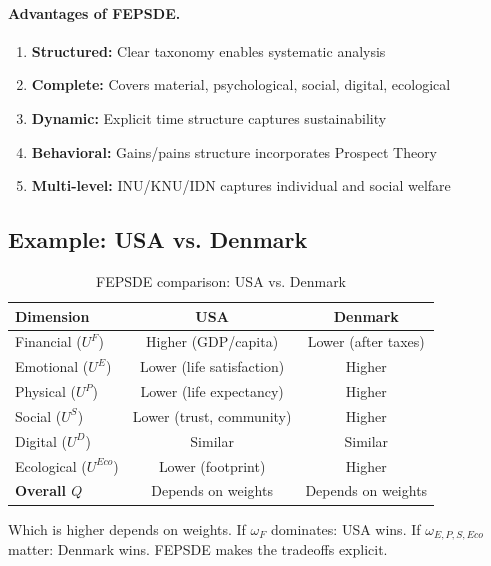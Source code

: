 \paragraph{Advantages of FEPSDE.}
\begin{enumerate}[nosep]
  \item \textbf{Structured:} Clear taxonomy enables systematic analysis
  \item \textbf{Complete:} Covers material, psychological, social, digital, ecological
  \item \textbf{Dynamic:} Explicit time structure captures sustainability
  \item \textbf{Behavioral:} Gains/pains structure incorporates Prospect Theory
  \item \textbf{Multi-level:} INU/KNU/IDN captures individual and social welfare
\end{enumerate}

\subsection{Example: USA vs. Denmark}

\begin{table}[h]
\centering
\begin{tabular}{lcc}
\toprule
\textbf{Dimension} & \textbf{USA} & \textbf{Denmark} \\
\midrule
Financial ($U^F$) & Higher (GDP/capita) & Lower (after taxes) \\
Emotional ($U^E$) & Lower (life satisfaction) & Higher \\
Physical ($U^P$) & Lower (life expectancy) & Higher \\
Social ($U^S$) & Lower (trust, community) & Higher \\
Digital ($U^D$) & Similar & Similar \\
Ecological ($U^{Eco}$) & Lower (footprint) & Higher \\
\midrule
\textbf{Overall $Q$} & Depends on weights & Depends on weights \\
\bottomrule
\end{tabular}
\caption{FEPSDE comparison: USA vs. Denmark}
\label{tab:usa-denmark}
\end{table}

Which is higher depends on weights.
If $\omega_F$ dominates: USA wins.
If $\omega_{E,P,S,Eco}$ matter: Denmark wins.
FEPSDE makes the tradeoffs explicit.

